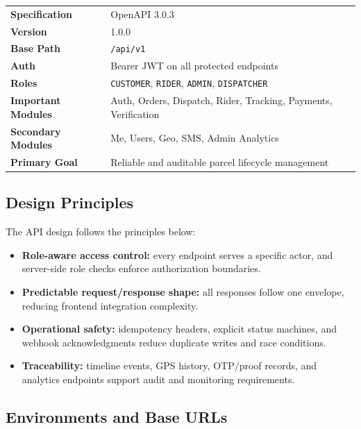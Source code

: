 \begin{tcolorbox}[
		enhanced,
		colback=InfoBlue!6,
		colframe=InfoBlue,
		arc=5pt,
		boxrule=1pt,
		left=10pt, right=10pt, top=7pt, bottom=7pt,
		title={\bfseries API At a Glance},
		fonttitle=\bfseries\color{white},
		colbacktitle=InfoBlue
]
\begin{tabular}{@{}p{4.2cm}p{9.4cm}@{}}
\textbf{Specification} & OpenAPI 3.0.3 \\
\textbf{Version} & 1.0.0 \\
\textbf{Base Path} & \texttt{/api/v1} \\
\textbf{Auth} & Bearer JWT on all protected endpoints \\
\textbf{Roles} & \texttt{CUSTOMER}, \texttt{RIDER}, \texttt{ADMIN}, \texttt{DISPATCHER} \\
\textbf{Important Modules} & Auth, Orders, Dispatch, Rider, Tracking, Payments, Verification \\
\textbf{Secondary Modules} & Me, Users, Geo, SMS, Admin Analytics \\
\textbf{Primary Goal} & Reliable and auditable parcel lifecycle management \\
\end{tabular}
\end{tcolorbox}

\subsection{Design Principles}

The API design follows the principles below:
\begin{itemize}
		\item \textbf{Role-aware access control:} every endpoint serves a specific actor,
					and server-side role checks enforce authorization boundaries.
		\item \textbf{Predictable request/response shape:} all responses follow one
					envelope, reducing frontend integration complexity.
		\item \textbf{Operational safety:} idempotency headers, explicit status machines,
					and webhook acknowledgments reduce duplicate writes and race conditions.
		\item \textbf{Traceability:} timeline events, GPS history, OTP/proof records,
					and analytics endpoints support audit and monitoring requirements.
\end{itemize}

\subsection{Environments and Base URLs}

